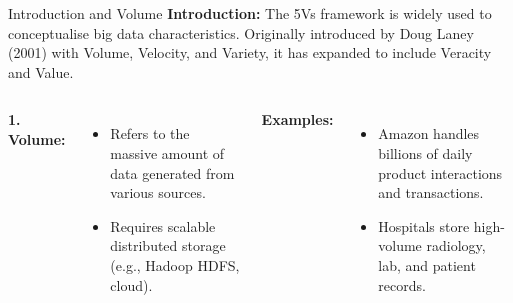 \documentclass[aspectratio=169, table]{beamer}
\begin{document}
	\begin{frame}[fragile]{Introduction and Volume}
		\vspace{20pt}
		\textbf{Introduction:} The 5Vs framework is widely used to conceptualise big data characteristics. Originally introduced by Doug Laney (2001) with Volume, Velocity, and Variety, it has expanded to include Veracity and Value.
		
		\vspace{10pt}
		\begin{columns}[T]
			\textbf{1. Volume:}
			\begin{itemize}
				\item Refers to the massive amount of data generated from various sources.
				\item Requires scalable distributed storage (e.g., Hadoop HDFS, cloud).
			\end{itemize}
			
			\textbf{Examples:}
			\begin{itemize}
				\item Amazon handles billions of daily product interactions and transactions.
				\item Hospitals store high-volume radiology, lab, and patient records.
			\end{itemize}
		\end{columns}
	\end{frame}
	
\end{document}
